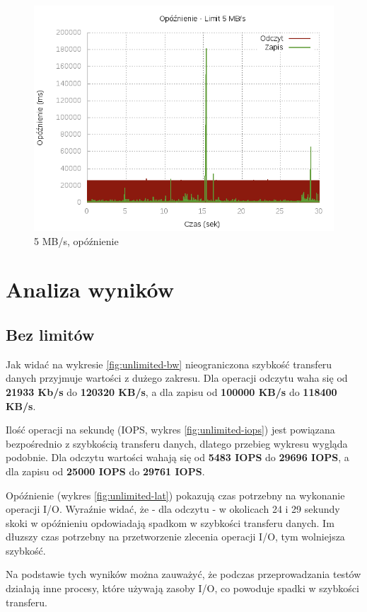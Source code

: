 \begin{figure}[h]
	\centering
	\includegraphics[scale=0.9]{results/5_lat.png}
		\caption{5 MB/s, opóźnienie}
    \label{fig:5-lat}
\end{figure}

\clearpage
\newpage
\section{Analiza wyników}
\subsection{Bez limitów}
Jak widać na wykresie \ref{fig:unlimited-bw}
nieograniczona szybkość transferu danych przyjmuje wartości z dużego zakresu. Dla operacji odczytu
waha się od \textbf{21933 Kb/s} do \textbf{120320 KB/s}, a dla zapisu od
\textbf{100000 KB/s} do \textbf{118400 KB/s}.

Ilość operacji na sekundę (IOPS, wykres \ref{fig:unlimited-iops}) jest powiązana bezpośrednio z szybkością transferu danych, dlatego
przebieg wykresu wygląda podobnie. Dla odczytu wartości wahają się
od \textbf{5483 IOPS} do \textbf{29696 IOPS}, a dla zapisu od \textbf{25000 IOPS}
do \textbf{29761 IOPS}.

Opóźnienie (wykres \ref{fig:unlimited-lat})
pokazują czas potrzebny na wykonanie operacji I/O. Wyraźnie widać, że
- dla odczytu - w okolicach 24 i 29 sekundy skoki w opóźnieniu opdowiadają
spadkom w szybkości transferu danych. Im dłuzszy czas potrzebny na przetworzenie
zlecenia operacji I/O, tym wolniejsza szybkość.

Na podstawie tych wyników można
zauważyć, że podczas przeprowadzania testów działają inne procesy, które
używają zasoby I/O, co powoduje spadki w szybkości transferu.

